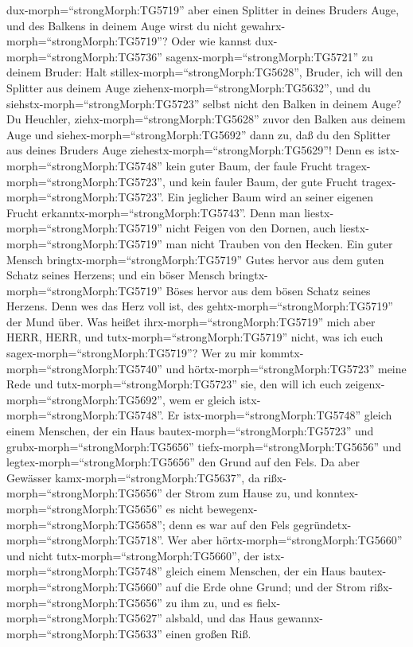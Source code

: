 dux-morph=``strongMorph:TG5719'' aber einen Splitter in deines Bruders
Auge, und des Balkens in deinem Auge wirst du nicht
gewahrx-morph=``strongMorph:TG5719''?  Oder wie kannst
dux-morph=``strongMorph:TG5736'' sagenx-morph=``strongMorph:TG5721'' zu
deinem Bruder: Halt stillex-morph=``strongMorph:TG5628'', Bruder, ich
will den Splitter aus deinem Auge ziehenx-morph=``strongMorph:TG5632'',
und du siehstx-morph=``strongMorph:TG5723'' selbst nicht den Balken in
deinem Auge? Du Heuchler, ziehx-morph=``strongMorph:TG5628'' zuvor den
Balken aus deinem Auge und siehex-morph=``strongMorph:TG5692'' dann zu,
daß du den Splitter aus deines Bruders Auge
ziehestx-morph=``strongMorph:TG5629''!  Denn es
istx-morph=``strongMorph:TG5748'' kein guter Baum, der faule Frucht
tragex-morph=``strongMorph:TG5723'', und kein fauler Baum, der gute
Frucht tragex-morph=``strongMorph:TG5723''.  Ein jeglicher
Baum wird an seiner eigenen Frucht
erkanntx-morph=``strongMorph:TG5743''. Denn man
liestx-morph=``strongMorph:TG5719'' nicht Feigen von den Dornen, auch
liestx-morph=``strongMorph:TG5719'' man nicht Trauben von den Hecken.
 Ein guter Mensch bringtx-morph=``strongMorph:TG5719''
Gutes hervor aus dem guten Schatz seines Herzens; und ein böser Mensch
bringtx-morph=``strongMorph:TG5719'' Böses hervor aus dem bösen Schatz
seines Herzens. Denn wes das Herz voll ist, des
gehtx-morph=``strongMorph:TG5719'' der Mund über.  Was
heißet ihrx-morph=``strongMorph:TG5719'' mich aber HERR, HERR, und
tutx-morph=``strongMorph:TG5719'' nicht, was ich euch
sagex-morph=``strongMorph:TG5719''?  Wer zu mir
kommtx-morph=``strongMorph:TG5740'' und
hörtx-morph=``strongMorph:TG5723'' meine Rede und
tutx-morph=``strongMorph:TG5723'' sie, den will ich euch
zeigenx-morph=``strongMorph:TG5692'', wem er gleich
istx-morph=``strongMorph:TG5748''.  Er
istx-morph=``strongMorph:TG5748'' gleich einem Menschen, der ein Haus
bautex-morph=``strongMorph:TG5723'' und
grubx-morph=``strongMorph:TG5656'' tiefx-morph=``strongMorph:TG5656''
und legtex-morph=``strongMorph:TG5656'' den Grund auf den Fels. Da aber
Gewässer kamx-morph=``strongMorph:TG5637'', da
rißx-morph=``strongMorph:TG5656'' der Strom zum Hause zu, und
konntex-morph=``strongMorph:TG5656'' es nicht
bewegenx-morph=``strongMorph:TG5658''; denn es war auf den Fels
gegründetx-morph=``strongMorph:TG5718''.  Wer aber
hörtx-morph=``strongMorph:TG5660'' und nicht
tutx-morph=``strongMorph:TG5660'', der istx-morph=``strongMorph:TG5748''
gleich einem Menschen, der ein Haus bautex-morph=``strongMorph:TG5660''
auf die Erde ohne Grund; und der Strom rißx-morph=``strongMorph:TG5656''
zu ihm zu, und es fielx-morph=``strongMorph:TG5627'' alsbald, und das
Haus gewannx-morph=``strongMorph:TG5633'' einen großen Riß.

